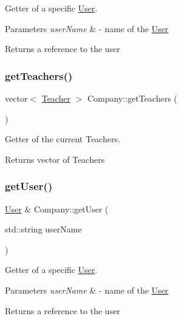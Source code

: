 Getter of a specific \mbox{\hyperlink{class_user}{User}}. 


\begin{DoxyParams}{Parameters}
{\em user\+Name} & -\/ name of the \mbox{\hyperlink{class_user}{User}} \\
\hline
\end{DoxyParams}
\begin{DoxyReturn}{Returns}
a reference to the user 
\end{DoxyReturn}
\mbox{\label{class_company_a000159ce012318a6edf0335447ad8bde}} 
\subsubsection{\texorpdfstring{get\+Teachers()}{getTeachers()}}
{\footnotesize\ttfamily vector$<$ \mbox{\hyperlink{class_teacher}{Teacher}} $>$ Company\+::get\+Teachers (\begin{DoxyParamCaption}{ }\end{DoxyParamCaption})}



Getter of the current Teachers. 

\begin{DoxyReturn}{Returns}
vector of Teachers 
\end{DoxyReturn}
\mbox{\label{class_company_a314cbc50e394b65f3b07670855029eef}} 
\subsubsection{\texorpdfstring{get\+User()}{getUser()}}
{\footnotesize\ttfamily \mbox{\hyperlink{class_user}{User}} \& Company\+::get\+User (\begin{DoxyParamCaption}\item[{std\+::string}]{user\+Name }\end{DoxyParamCaption})}



Getter of a specific \mbox{\hyperlink{class_user}{User}}. 


\begin{DoxyParams}{Parameters}
{\em user\+Name} & -\/ name of the \mbox{\hyperlink{class_user}{User}} \\
\hline
\end{DoxyParams}
\begin{DoxyReturn}{Returns}
a reference to the user 
\end{DoxyReturn}
\mbox{\label{class_company_a6f6a3dbf24278f5e1395d123d5812f33}} 
